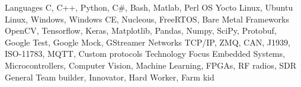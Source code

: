 

\begin{cvskills}

  \cvskill
    {Languages} %
    {C, C++, Python, C\#, Bash, Matlab, Perl} %
  \cvskill
    {OS} %
    {Yocto Linux, Ubuntu Linux, Windows, Windows CE, Nucleous, FreeRTOS, Bare Metal} %
  \cvskill
    {Frameworks} %
    {OpenCV, Tensorflow, Keras, Matplotlib, Pandas, Numpy, SciPy, Protobuf, Google Test, Google Mock, GStreamer} %
  \cvskill
    {Networks} %
    {TCP/IP, ZMQ, CAN, J1939, ISO-11783, MQTT, Custom protocols} %
  \cvskill
    {Technology Focus} %
    {Embedded Systems, Microcontrollers, Computer Vision, Machine Learning, FPGAs, RF radios, SDR} %
    \cvskill
    {General} %
    {Team builder, Innovator, Hard Worker, Farm kid} %

\end{cvskills}

